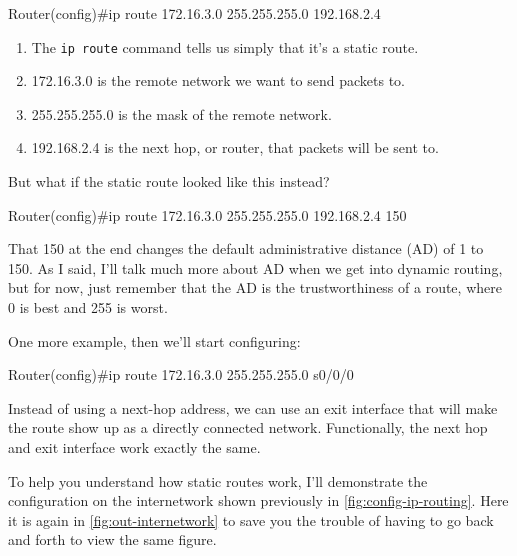 \begin{cli}
Router(config)#ip route 172.16.3.0 255.255.255.0 192.168.2.4
\end{cli}

\begin{enumerate}
\item
  The \texttt{ip\ route} command tells us simply that it's a static
  route.
\item
  172.16.3.0 is the remote network we want to send packets to.
\item
  255.255.255.0 is the mask of the remote network.
\item
  192.168.2.4 is the next hop, or router, that packets will be sent to.
\end{enumerate}

But what if the static route looked like this instead?

\begin{cli}
Router(config)#ip route 172.16.3.0 255.255.255.0 192.168.2.4 150
\end{cli}

That 150 at the end changes the default administrative distance (AD) of
1 to 150. As I said, I'll talk much more about AD when we get into
dynamic routing, but for now, just remember that the AD is the
trustworthiness of a route, where 0 is best and 255 is worst.

One more example, then we'll start configuring:

\begin{cli}
Router(config)#ip route 172.16.3.0 255.255.255.0 s0/0/0
\end{cli}

Instead of using a next-hop address, we can use an exit interface that
will make the route show up as a directly connected network.
Functionally, the next hop and exit interface work exactly the same.

To help you understand how static routes work, I'll demonstrate the
configuration on the internetwork shown previously in \vref{fig:config-ip-routing}.
Here it is again in \cref{fig:out-internetwork} to save you the trouble of having to go back and forth to view the same figure.

